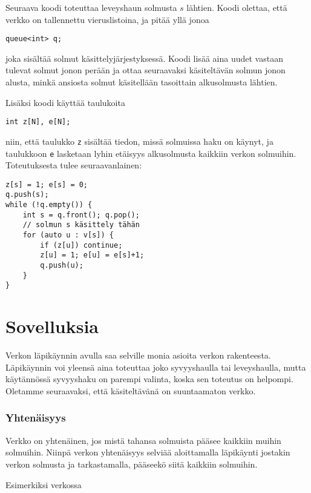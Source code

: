 Seuraava koodi toteuttaa leveyshaun
solmusta $s$ lähtien.
Koodi olettaa, että verkko on tallennettu
vieruslistoina, ja pitää yllä jonoa
\begin{lstlisting}
queue<int> q;
\end{lstlisting}
joka sisältää solmut käsittelyjärjestyksessä.
Koodi lisää aina uudet vastaan tulevat solmut
jonon perään ja ottaa seuraavaksi käsiteltävän
solmun jonon alusta,
minkä ansiosta solmut käsitellään tasoittain
alkusolmusta lähtien.

Lisäksi koodi käyttää taulukoita
\begin{lstlisting}
int z[N], e[N];
\end{lstlisting}
niin, että taulukko \texttt{z} sisältää tiedon,
missä solmuissa haku on käynyt,
ja taulukkoon \texttt{e} lasketaan lyhin
etäisyys alkusolmusta kaikkiin verkon solmuihin.
Toteutuksesta tulee seuraavanlainen:
\begin{lstlisting}
z[s] = 1; e[s] = 0;
q.push(s);
while (!q.empty()) {
    int s = q.front(); q.pop();
    // solmun s käsittely tähän     
    for (auto u : v[s]) {
        if (z[u]) continue;
        z[u] = 1; e[u] = e[s]+1;
        q.push(u);
    }
}
\end{lstlisting}

\section{Sovelluksia}

Verkon läpikäynnin avulla
saa selville monia asioita
verkon rakenteesta.
Läpikäynnin voi yleensä aina toteuttaa
joko syvyyshaulla tai leveyshaulla,
mutta käytännössä syvyyshaku on parempi valinta,
koska sen toteutus on helpompi.
Oletamme seuraavaksi, että käsiteltävänä on
suuntaamaton verkko.

\subsubsection{Yhtenäisyys}


Verkko on yhtenäinen,
jos mistä tahansa solmuista
pääsee kaikkiin muihin solmuihin.
Niinpä verkon yhtenäisyys selviää
aloittamalla läpikäynti
jostakin verkon solmusta ja
tarkastamalla, pääseekö siitä kaikkiin solmuihin.

Esimerkiksi verkossa

\begin{center}
\end{center}

